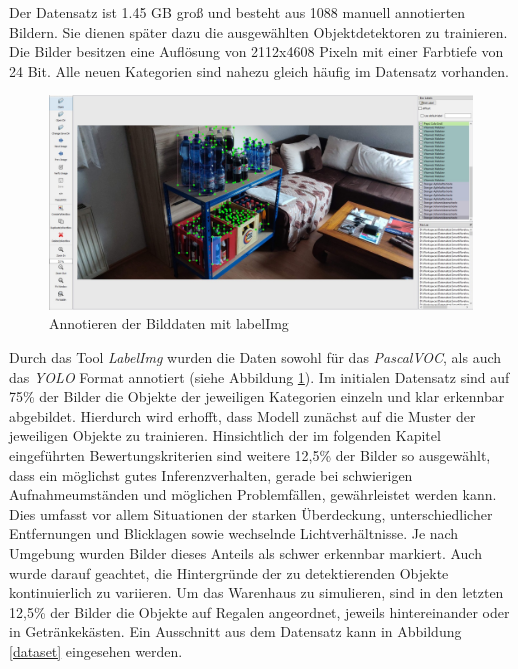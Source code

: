 Der Datensatz ist 1.45 GB groß und besteht aus 1088 manuell annotierten Bildern. Sie dienen später dazu die ausgewählten Objektdetektoren zu trainieren. Die Bilder besitzen eine Auflösung von 2112x4608 Pixeln mit einer Farbtiefe von 24 Bit. Alle neuen Kategorien sind nahezu gleich häufig im Datensatz vorhanden. 

\begin{figure}[H]
	\begin{center}
		\includegraphics[width=16cm]{Bilder/labelImg.jpeg} 
		\caption[Annotieren der Bilddaten mit labelImg]{Annotieren der Bilddaten mit labelImg}
		\label{labelImg}
	\end{center}
\end{figure}

Durch das Tool \textit{LabelImg} wurden die Daten sowohl für das \textit{PascalVOC}, als auch das \textit{YOLO} Format annotiert (siehe Abbildung \ref{labelImg}). Im initialen Datensatz sind auf 75\% der Bilder die Objekte der jeweiligen Kategorien einzeln und klar erkennbar abgebildet. Hierdurch wird erhofft, dass Modell zunächst auf die Muster der jeweiligen Objekte zu trainieren. Hinsichtlich der im folgenden Kapitel eingeführten Bewertungskriterien sind weitere 12,5\% der Bilder so ausgewählt, dass ein möglichst gutes Inferenzverhalten, gerade bei schwierigen Aufnahmeumständen und möglichen Problemfällen, gewährleistet werden kann. Dies umfasst vor allem Situationen der starken Überdeckung, unterschiedlicher Entfernungen und Blicklagen sowie wechselnde Lichtverhältnisse. Je nach Umgebung wurden Bilder dieses Anteils als schwer erkennbar markiert. Auch wurde darauf geachtet, die Hintergründe der zu detektierenden Objekte kontinuierlich zu variieren. Um das Warenhaus zu simulieren, sind in den letzten 12,5\% der Bilder die Objekte auf Regalen angeordnet, jeweils hintereinander oder in Getränkekästen. Ein Ausschnitt aus dem Datensatz kann in Abbildung \ref{dataset} eingesehen werden. 

